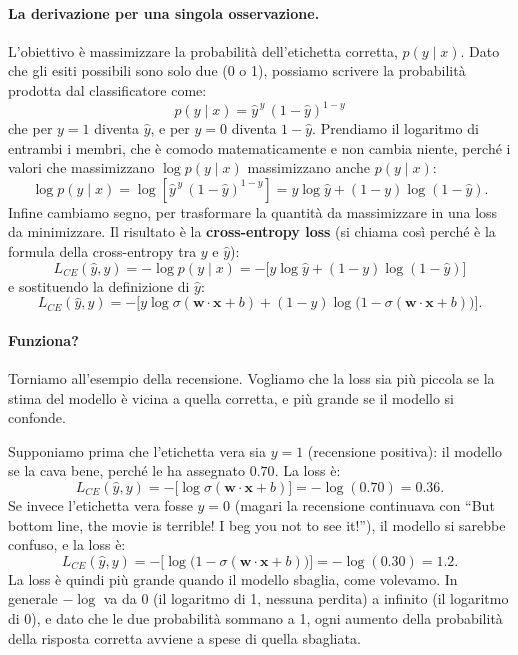 \paragraph{La derivazione per una singola osservazione.} L'obiettivo è massimizzare la probabilità dell'etichetta corretta, $p(y \mid x)$. Dato che gli esiti possibili sono solo due (0 o 1), possiamo scrivere la probabilità prodotta dal classificatore come:
\begin{equation}
p(y \mid x) = \hat{y}^{\,y}\, (1 - \hat{y})^{1 - y}
\end{equation}
che per $y = 1$ diventa $\hat{y}$, e per $y = 0$ diventa $1 - \hat{y}$. Prendiamo il logaritmo di entrambi i membri, che è comodo matematicamente e non cambia niente, perché i valori che massimizzano $\log p(y \mid x)$ massimizzano anche $p(y \mid x)$:
\begin{equation}
\log p(y \mid x) = \log\left[\hat{y}^{\,y}\, (1 - \hat{y})^{1 - y}\right] = y \log \hat{y} + (1 - y) \log(1 - \hat{y}).
\end{equation}
Infine cambiamo segno, per trasformare la quantità da massimizzare in una loss da minimizzare. Il risultato è la \textbf{cross-entropy loss} (si chiama così perché è la formula della cross-entropy tra $y$ e $\hat{y}$):
\begin{equation}
L_{CE}(\hat{y}, y) = -\log p(y \mid x) = -\big[y \log \hat{y} + (1 - y) \log(1 - \hat{y})\big]
\end{equation}
e sostituendo la definizione di $\hat{y}$:
\begin{equation}\label{eq:ce}
L_{CE}(\hat{y}, y) = -\big[y \log \sigma(\mathbf{w} \cdot \mathbf{x} + b) + (1 - y) \log\big(1 - \sigma(\mathbf{w} \cdot \mathbf{x} + b)\big)\big].
\end{equation}

\paragraph{Funziona?} Torniamo all'esempio della recensione. Vogliamo che la loss sia più piccola se la stima del modello è vicina a quella corretta, e più grande se il modello si confonde.

Supponiamo prima che l'etichetta vera sia $y = 1$ (recensione positiva): il modello se la cava bene, perché le ha assegnato $0.70$. La loss è:
\[
L_{CE}(\hat{y}, y) = -\big[\log \sigma(\mathbf{w} \cdot \mathbf{x} + b)\big] = -\log(0.70) = 0.36.
\]
Se invece l'etichetta vera fosse $y = 0$ (magari la recensione continuava con \enquote{But bottom line, the movie is terrible! I beg you not to see it!}), il modello si sarebbe confuso, e la loss è:
\[
L_{CE}(\hat{y}, y) = -\big[\log\big(1 - \sigma(\mathbf{w} \cdot \mathbf{x} + b)\big)\big] = -\log(0.30) = 1.2.
\]
La loss è quindi più grande quando il modello sbaglia, come volevamo. In generale $-\log$ va da 0 (il logaritmo di 1, nessuna perdita) a infinito (il logaritmo di 0), e dato che le due probabilità sommano a 1, ogni aumento della probabilità della risposta corretta avviene a spese di quella sbagliata.

